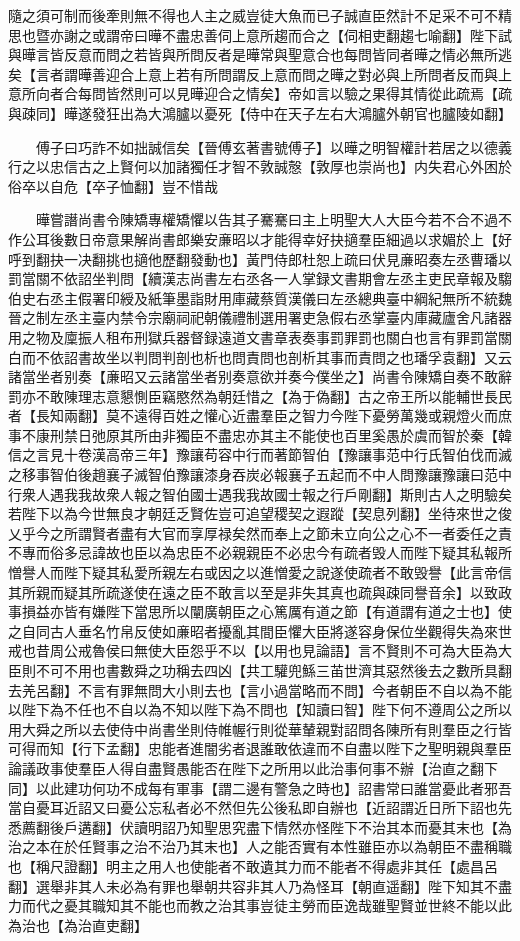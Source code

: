 隨之須可制而後牽則無不得也人主之威豈徒大魚而已子誠直臣然計不足采不可不精思也暨亦謝之或謂帝曰曄不盡忠善伺上意所趨而合之【伺相吏翻趨七喻翻】陛下試與曄言皆反意而問之若皆與所問反者是曄常與聖意合也每問皆同者曄之情必無所逃矣【言者謂曄善迎合上意上若有所問謂反上意而問之曄之對必與上所問者反而與上意所向者合每問皆然則可以見曄迎合之情矣】帝如言以驗之果得其情從此疏焉【疏與疎同】曄遂發狂出為大鴻臚以憂死【侍中在天子左右大鴻臚外朝官也臚陵如翻】

　　傅子曰巧詐不如拙誠信矣【晉傅玄著書號傅子】以曄之明智權計若居之以德義行之以忠信古之上賢何以加諸獨任才智不敦誠慤【敦厚也崇尚也】内失君心外困於俗卒以自危【卒子恤翻】豈不惜哉

　　曄嘗譖尚書令陳矯專權矯懼以告其子騫騫曰主上明聖大人大臣今若不合不過不作公耳後數日帝意果解尚書郎樂安亷昭以才能得幸好抉擿羣臣細過以求媚於上【好呼到翻抉一决翻挑也擿他歷翻發動也】黃門侍郎杜恕上疏曰伏見亷昭奏左丞曹璠以罰當關不依詔坐判問【續漢志尚書左右丞各一人掌録文書期會左丞主吏民章報及騶伯史右丞主假署印綬及紙筆墨詣財用庫藏蔡質漢儀曰左丞總典臺中綱紀無所不統魏晉之制左丞主臺内禁令宗廟祠祀朝儀禮制選用署吏急假右丞掌臺内庫藏廬舍凡諸器用之物及廩振人租布刑獄兵器督録遠道文書章表奏事罰罪罰也關白也言有罪罰當關白而不依詔書故坐以判問判剖也析也問責問也剖析其事而責問之也璠孚袁翻】又云諸當坐者别奏【亷昭又云諸當坐者别奏意欲并奏今僕坐之】尚書令陳矯自奏不敢辭罰亦不敢陳理志意懇惻臣竊愍然為朝廷惜之【為于偽翻】古之帝王所以能輔世長民者【長知兩翻】莫不遠得百姓之懽心近盡羣臣之智力今陛下憂勞萬幾或親燈火而庶事不康刑禁日弛原其所由非獨臣不盡忠亦其主不能使也百里奚愚於虞而智於秦【韓信之言見十卷漢高帝三年】豫讓苟容中行而著節智伯【豫讓事范中行氏智伯伐而滅之移事智伯後趙襄子滅智伯豫讓漆身吞炭必報襄子五起而不中人問豫讓豫讓曰范中行衆人遇我我故衆人報之智伯國士遇我我故國士報之行戶剛翻】斯則古人之明驗矣若陛下以為今世無良才朝廷乏賢佐豈可追望稷契之遐蹤【契息列翻】坐待來世之俊乂乎今之所謂賢者盡有大官而享厚禄矣然而奉上之節未立向公之心不一者委任之責不專而俗多忌諱故也臣以為忠臣不必親親臣不必忠今有疏者毁人而陛下疑其私報所憎譽人而陛下疑其私愛所親左右或因之以進憎愛之說遂使疏者不敢毁譽【此言帝信其所親而疑其所疏遂使在遠之臣不敢言以至是非失其真也疏與疎同譽音余】以致政事損益亦皆有嫌陛下當思所以闡廣朝臣之心篤厲有道之節【有道謂有道之士也】使之自同古人垂名竹帛反使如亷昭者擾亂其間臣懼大臣將遂容身保位坐觀得失為來世戒也昔周公戒魯侯曰無使大臣怨乎不以【以用也見論語】言不賢則不可為大臣為大臣則不可不用也書數舜之功稱去四凶【共工驩兜鯀三苖世濟其惡然後去之數所具翻去羌呂翻】不言有罪無問大小則去也【言小過當略而不問】今者朝臣不自以為不能以陛下為不任也不自以為不知以陛下為不問也【知讀曰智】陛下何不遵周公之所以用大舜之所以去使侍中尚書坐則侍帷幄行則從華輦親對詔問各陳所有則羣臣之行皆可得而知【行下孟翻】忠能者進闇劣者退誰敢依違而不自盡以陛下之聖明親與羣臣論議政事使羣臣人得自盡賢愚能否在陛下之所用以此治事何事不辦【治直之翻下同】以此建功何功不成每有軍事【謂二邊有警急之時也】詔書常曰誰當憂此者邪吾當自憂耳近詔又曰憂公忘私者必不然但先公後私即自辦也【近詔謂近日所下詔也先悉薦翻後戶遘翻】伏讀明詔乃知聖思究盡下情然亦怪陛下不治其本而憂其末也【為治之本在於任賢事之治不治乃其末也】人之能否實有本性雖臣亦以為朝臣不盡稱職也【稱尺證翻】明主之用人也使能者不敢遺其力而不能者不得處非其任【處昌呂翻】選舉非其人未必為有罪也舉朝共容非其人乃為怪耳【朝直遥翻】陛下知其不盡力而代之憂其職知其不能也而教之治其事豈徒主勞而臣逸哉雖聖賢並世終不能以此為治也【為治直吏翻】